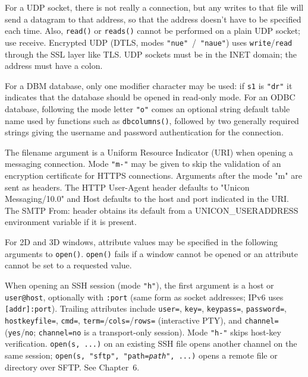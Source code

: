 For a UDP socket, there is not really a connection, but any writes to
that file will send a datagram to that address, so that the address
doesn't have to be specified each time. Also,
\texttt{read()} or \texttt{reads()} cannot be performed on a plain UDP
socket; use receive. Encrypted UDP (DTLS, modes \texttt{"nue"}~/~\texttt{"naue"})
uses \texttt{write}/\texttt{read} through the SSL layer like TLS.
UDP sockets must be in the INET domain; the
address must have a colon. 

For a DBM database, only one modifier character may be used: if
\texttt{s1} is \texttt{"dr"} it indicates that the database should be
opened in read-only mode.  For an ODBC database, following the mode
letter \texttt{"o"} comes an optional string default table name used
by functions such as \texttt{dbcolumns()}, followed by two generally
required strings giving the username and password authentication for the
connection.

The filename argument is a Uniform Resource Indicator (URI) when opening
a messaging connection. Mode \texttt{"m-"} may be given to skip the
validation of an encryption certificate for HTTPS connections.
Arguments after the mode "m" are sent as headers. The HTTP
User-Agent header defaults to "Unicon
Messaging/10.0" and Host defaults to the host and port
indicated in the URI. The SMTP From: header obtains its default from a
UNICON\_USERADDRESS environment variable if it is present.

For 2D and 3D windows, attribute values may be specified in the
following arguments to \texttt{open()}. \texttt{open()} fails if a
window cannot be opened or an attribute cannot be set to a requested
value.

When opening an SSH session (mode \texttt{"h"}), the first argument is a
host or \texttt{user@host}, optionally with \texttt{:port} (same form as
socket addresses; IPv6 uses \texttt{[addr]:port}). Trailing attributes
include \texttt{user=}, \texttt{key=}, \texttt{keypass=},
\texttt{password=}, \texttt{hostkeyfile=}, \texttt{cmd=},
\texttt{term=}/\texttt{cols=}/\texttt{rows=} (interactive PTY), and
\texttt{channel=} (\texttt{yes}/\texttt{no}; \texttt{channel=no} is a
transport-only session). Mode \texttt{"h-"} skips host-key verification.
\texttt{open(s, ...)} on an existing SSH file opens another channel on
the same session; \texttt{open(s, "sftp", "path=\textit{path}", ...)}
opens a remote file or directory over SFTP. See Chapter~6.

